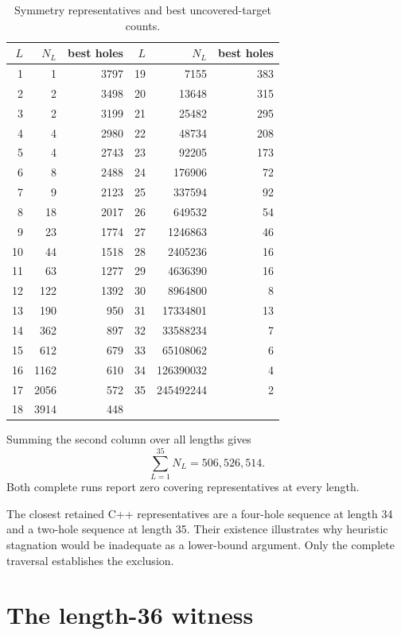 \documentclass[11pt]{article}
\begin{document}
\begin{table}[ht]
\centering
\small
\begin{tabular}{rrr@{\qquad}rrr}
\toprule
\(L\) & \(N_L\) & best holes & \(L\) & \(N_L\) & best holes\\
\midrule
1  & 1         & 3797 & 19 & 7155      & 383\\
2  & 2         & 3498 & 20 & 13648     & 315\\
3  & 2         & 3199 & 21 & 25482     & 295\\
4  & 4         & 2980 & 22 & 48734     & 208\\
5  & 4         & 2743 & 23 & 92205     & 173\\
6  & 8         & 2488 & 24 & 176906    & 72\\
7  & 9         & 2123 & 25 & 337594    & 92\\
8  & 18        & 2017 & 26 & 649532    & 54\\
9  & 23        & 1774 & 27 & 1246863   & 46\\
10 & 44        & 1518 & 28 & 2405236   & 16\\
11 & 63        & 1277 & 29 & 4636390   & 16\\
12 & 122       & 1392 & 30 & 8964800   & 8\\
13 & 190       & 950  & 31 & 17334801  & 13\\
14 & 362       & 897  & 32 & 33588234  & 7\\
15 & 612       & 679  & 33 & 65108062  & 6\\
16 & 1162      & 610  & 34 & 126390032 & 4\\
17 & 2056      & 572  & 35 & 245492244 & 2\\
18 & 3914      & 448  &    &           & \\
\bottomrule
\end{tabular}
\caption{Symmetry representatives and best uncovered-target counts.}
\label{tab:counts}
\end{table}

Summing the second column over all lengths gives
\[
  \sum_{L=1}^{35}N_L=506{,}526{,}514.
\]
Both complete runs report zero covering representatives at every length.

The closest retained C++ representatives are a four-hole sequence at length
34 and a two-hole sequence at length 35. Their existence illustrates why
heuristic stagnation would be inadequate as a lower-bound argument. Only the
complete traversal establishes the exclusion.

\section{The length-36 witness}
\end{document}
